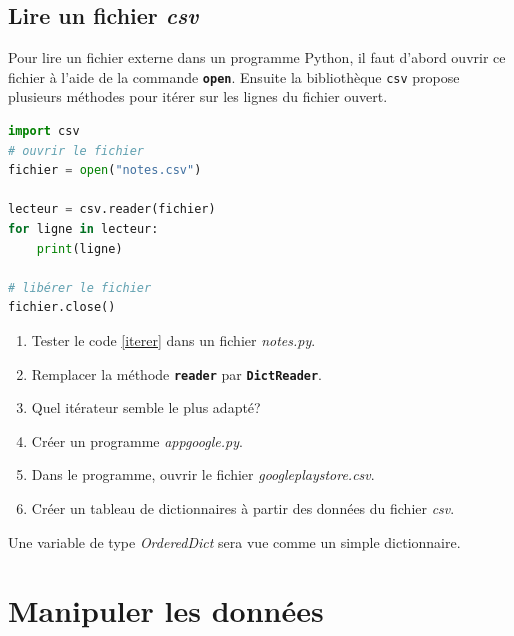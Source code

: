 \documentclass[a4paper,11pt]{article}
\begin{document}
\subsection{Lire un fichier \emph{csv}}
Pour lire un fichier externe dans un programme Python, il faut d'abord ouvrir ce fichier à l'aide de la commande \textbf{\texttt{open}}. Ensuite la bibliothèque \texttt{csv} propose plusieurs méthodes pour itérer sur les lignes du fichier ouvert.
\begin{center}
    \begin{lstlisting}[language=Python]
import csv
# ouvrir le fichier
fichier = open("notes.csv")

lecteur = csv.reader(fichier)
for ligne in lecteur:
    print(ligne)

# libérer le fichier
fichier.close()
\end{lstlisting}
    \label{iterer}
\end{center}
\begin{activite}
    \begin{enumerate}
        \item Tester le code \ref{iterer} dans un fichier \emph{notes.py}.
        \item Remplacer la méthode \textbf{\texttt{reader}} par \textbf{\texttt{DictReader}}.
        \item Quel itérateur semble le plus adapté?
        \item Créer un programme \emph{appgoogle.py}.
        \item Dans le programme, ouvrir le fichier \emph{googleplaystore.csv}.
        \item Créer un tableau de dictionnaires à partir des données du fichier \emph{csv}.
    \end{enumerate}
\end{activite}
\begin{aretenir}[Commentaire]
    Une variable de type \emph{OrderedDict} sera vue comme un simple dictionnaire.
\end{aretenir}
\section{Manipuler les données}
\end{document}
